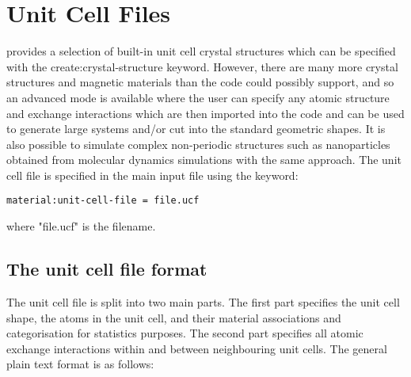 \chapter{Unit Cell Files}\label{chap:unitcellfiles}
\vampire provides a selection of built-in unit cell crystal structures which can be specified with the 
create:crystal-structure keyword. However, there are many more crystal structures and magnetic materials than the code could possibly support, and so an advanced mode is available where the user can specify any atomic structure and exchange interactions which are then imported into the code and can be used to generate large systems and/or cut into the standard geometric shapes. It is also possible to simulate complex non-periodic structures such as nanoparticles obtained from molecular dynamics simulations with the same approach. The unit cell file is specified in the main input file using the keyword:
\begin{verbatim}
material:unit-cell-file = file.ucf
\end{verbatim}
where "file.ucf" is the filename. 

\section*{The unit cell file format}
The unit cell file is split into two main parts. The first part specifies the unit cell shape, the atoms in the unit cell, and their material associations and categorisation for statistics purposes. The second part specifies all atomic exchange interactions within and between neighbouring unit cells. The general plain text format is as follows:


